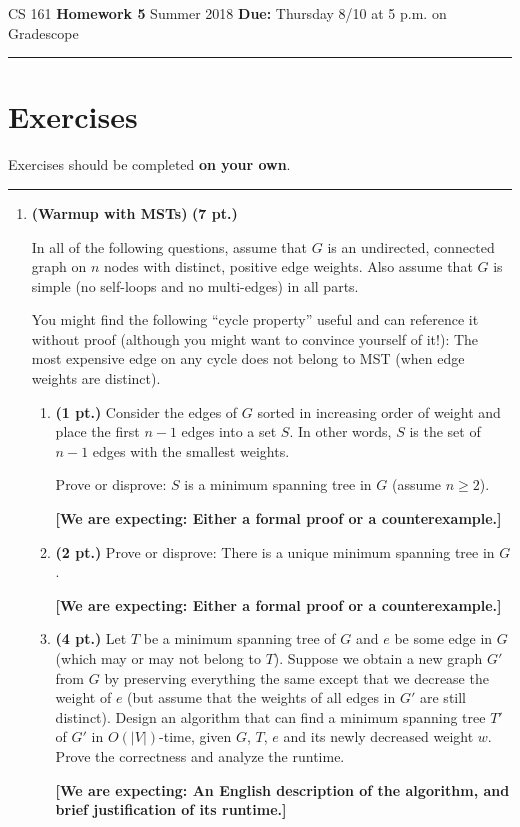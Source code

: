 \documentclass{article}
\begin{document}
\noindent
CS 161 \hfill \textbf{Homework 5} \newline 
Summer 2018 \hfill \textbf{Due:} Thursday 8/10 at 5 p.m. on Gradescope

\noindent\rule{\linewidth}{0.4pt}

\section*{Exercises}

Exercises should be completed \textbf{on your own}.

\noindent\rule{\linewidth}{1.0pt}

\begin{enumerate}
  \item \textbf{(Warmup with MSTs)} \textbf{(7 pt.)}

    In all of the following questions, assume that $G$ is an undirected,
    connected graph on $n$ nodes with distinct, positive edge weights. Also
    assume that $G$ is simple (no self-loops and no multi-edges) in all parts.

    You might find the following ``cycle property'' useful and can reference it
    without proof (although you might want to convince yourself of it!): The
    most expensive edge on any cycle does not belong to MST (when edge weights
    are distinct).
    
    \begin{enumerate}
      \item \textbf{(1 pt.)} Consider the edges of $G$ sorted in increasing
        order of weight and place the first $n-1$ edges into a set $S$. In
        other words, $S$ is the set of $n-1$ edges with the smallest weights.
    
        Prove or disprove: $S$ is a minimum spanning tree in $G$ (assume
        $n \geq 2$).
    
        \textbf{[We are expecting: Either a formal proof or a counterexample.]}
    \item \textbf{(2 pt.)} Prove or disprove: There is a unique minimum
      spanning tree in $G$.
    
        \textbf{[We are expecting: Either a formal proof or a counterexample.]}
    \item \textbf{(4 pt.)} Let $T$ be a minimum spanning tree of $G$ and $e$
      be some edge in $G$ (which may or may not belong to $T$). Suppose we
      obtain a new graph $G'$ from $G$ by preserving everything the same except
      that we decrease the weight of $e$ (but assume that the weights of all
      edges in $G'$ are still distinct). Design an algorithm that can find a
      minimum spanning tree $T'$ of $G'$ in $O(|V|)$-time, given $G$, $T$, $e$
      and its newly decreased weight $w$. Prove the correctness and analyze the
      runtime.
    
      \textbf{[We are expecting: An English description of the algorithm, and
      brief justification of its runtime.]}
    \end{enumerate}
\end{enumerate}
\end{document}
